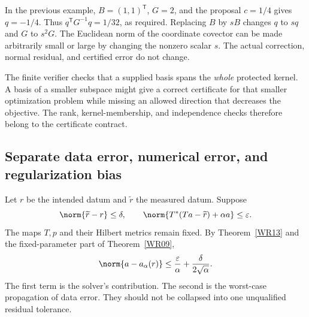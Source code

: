 In the previous example, $B=(1,1)^{\mathsf T}$, $G=2$, and the proposal $c=1/4$ gives $q=-1/4$. Thus $q^{\mathsf T}G^{-1}q=1/32$, as required. Replacing $B$ by $sB$ changes $q$ to $sq$ and $G$ to $s^2G$. The Euclidean norm of the coordinate covector can be made arbitrarily small or large by changing the nonzero scalar $s$. The actual correction, normal residual, and certified error do not change.


The finite verifier checks that a supplied basis spans the \emph{whole} protected kernel. A basis of a smaller subspace might give a correct certificate for that smaller optimization problem while missing an allowed direction that decreases the objective. The rank, kernel-membership, and independence checks therefore belong to the certificate contract.

\subsection{Separate data error, numerical error, and regularization bias}
Let $r$ be the intended datum and $\widetilde r$ the measured datum. Suppose
\[
 \norm{\widetilde r-r}\le\delta,
 \qquad \norm{T^*(Ta-\widetilde r)+\alpha a}\le\varepsilon.
\]
The maps $T,p$ and their Hilbert metrics remain fixed. By Theorem~\ref{WR13} and the fixed-parameter part of Theorem~\ref{WR09},
\begin{equation}\label{eq:combined-solver-data}
 \norm{a-a_\alpha(r)}
 \le \frac{\varepsilon}{\alpha}+\frac{\delta}{2\sqrt\alpha}.
\end{equation}
The first term is the solver's contribution. The second is the worst-case propagation of data error. They should not be collapsed into one unqualified residual tolerance.

